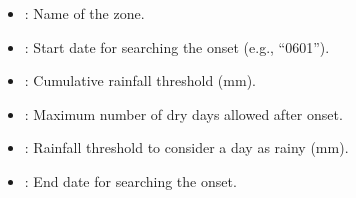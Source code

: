 \documentclass[letterpaper,10pt,english]{sphinxmanual}
\begin{document}
\begin{itemize}
\item {} 
\sphinxAtStartPar
{}: Name of the zone.

\item {} 
\sphinxAtStartPar
{}: Start date for searching the onset (e.g., “06\sphinxhyphen{}01”).

\item {} 
\sphinxAtStartPar
{}: Cumulative rainfall threshold (mm).

\item {} 
\sphinxAtStartPar
{}: Maximum number of dry days allowed after onset.

\item {} 
\sphinxAtStartPar
{}: Rainfall threshold to consider a day as rainy (mm).

\item {} 
\sphinxAtStartPar
{}: End date for searching the onset.

\end{itemize}

\sphinxAtStartPar
{}
\end{document}
